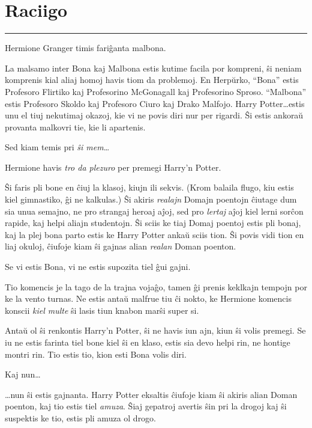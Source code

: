 \chapter{Raciigo}

\begin{center}\rule{3in}{0.4pt}\end{center}

Hermione Granger timis fariĝanta malbona.

La malsamo inter Bona kaj Malbona estis kutime facila por kompreni, ŝi
neniam komprenis kial aliaj homoj havis tiom da problemoj. En
Herpŭrko, ``Bona'' estis Profesoro Flirtiko kaj Profesorino McGonagall
kaj Profesorino Sproso. ``Malbona'' estis Profesoro Skoldo kaj
Profesoro Ciuro kaj Drako Malfojo. Harry Potter\ldots estis unu el
tiuj nekutimaj okazoj, kie vi ne povis diri nur per rigardi. Ŝi estis
ankoraŭ provanta malkovri tie, kie li apartenis.

Sed kiam temis pri \emph{ŝi mem}\ldots

Hermione havis \emph{tro da plezuro} per premegi Harry'n Potter.

Ŝi faris pli bone en ĉiuj la klasoj, kiujn ili sekvis. (Krom balaila
flugo, kiu estis kiel gimnastiko, ĝi ne kalkulas.) Ŝi akiris
\emph{realajn} Domajn poentojn ĉiutage dum sia unua semajno, ne pro
strangaj heroaj aĵoj, sed pro \emph{lertaj} aĵoj kiel lerni sorĉon
rapide, kaj helpi aliajn studentojn. Ŝi sciis ke tiaj Domaj poentoj
estis pli bonaj, kaj la plej bona parto estis ke Harry Potter ankaŭ
sciis tion. Ŝi povis vidi tion en liaj okuloj, ĉiufoje kiam ŝi gajnas
alian \emph{realan} Doman poenton.

Se vi estis Bona, vi ne estis supozita tiel ĝui gajni.

Tio komencis je la tago de la trajna vojaĝo, tamen ĝi prenis keklkajn
tempojn por ke la vento turnas. Ne estis antaŭ malfrue tiu ĉi nokto,
ke Hermione komencis konscii \emph{kiel multe} ŝi lasis tiun knabon
marŝi super si.

Antaŭ ol ŝi renkontis Harry'n Potter, ŝi ne havis iun ajn, kiun ŝi
volis premegi. Se iu ne estis farinta tiel bone kiel ŝi en klaso,
estis sia devo helpi rin, ne hontige montri rin. Tio estis tio, kion
esti Bona volis diri.

Kaj nun\ldots

\ldots nun ŝi estis gajnanta. Harry Potter eksaltis ĉiufoje kiam ŝi
akiris alian Doman poenton, kaj tio estis tiel \emph{amuza}. Ŝiaj
gepatroj avertis ŝin pri la drogoj kaj ŝi suspektis ke tio, estis pli
amuza ol drogo.

